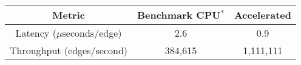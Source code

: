 \begin{table}[H]
\begin{centering}
\begin{tabular}{|c|c|c|}
\hline
\textbf{Metric}     &   \textbf{Benchmark CPU$^*$}   & \textbf{Accelerated} \\
\hline
Latency ($\mu$seconds/edge)  &   2.6  & 0.9 \\
\hline
Throughput (edges/second)  &   384,615  & 1,111,111 \\
\hline
\end{tabular}
\label{table:edg_col_performance_specs}
\end{centering}
\end{table}